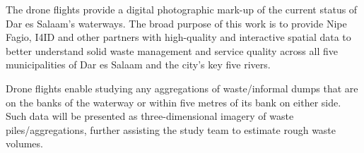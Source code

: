 \documentclass[a4paper,12pt,twoside]{article}
\begin{document}
\begin{multicols}{2}
The drone flights provide a digital photographic mark-up of the current status of Dar es Salaam’s waterways. The broad purpose of this work is to provide Nipe Fagio, I4ID and other partners with high-quality and interactive spatial data to better understand solid waste management and service quality across all five municipalities of Dar es Salaam and the city’s key five rivers.

\medskip

Drone flights enable studying any aggregations of waste/informal dumps that are on the banks of the waterway or within five metres of its bank on either side. Such data will be presented as three-dimensional imagery of waste piles/aggregations, further assisting the study team to estimate rough waste volumes.

\end{multicols}

\end{document}
